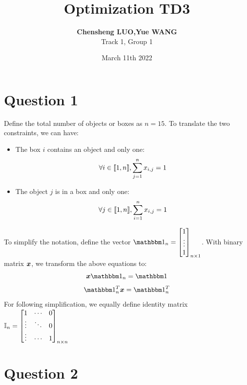 \documentclass{CSArticle}[english]
\title{\textbf{Optimization TD3}}
\author{\textbf{Chensheng LUO,Yue WANG}\\Track 1, Group 1}
\date{March 11th 2022}
\begin{document}
\MakeSimpleTitle


\section{Question 1}
\label{Q1}
Define the total number of objects or boxes as $n=15$. To translate the two constraints, we can have:
\begin{itemize}
    \item The box $i$ contains an object and only one:
\begin{equation}
    \forall i \in \llbracket1,n\rrbracket, \sum_{j=1}^{n}x_{i,j}=1
\end{equation}
\item The object $j$ is in a box and only one:
\begin{equation}
    \forall j \in \llbracket1,n\rrbracket, \sum_{i=1}^{n}x_{i,j}=1
\end{equation}
\end{itemize}
To simplify the notation, define the vector  $\Onebb_{n}=\left[\begin{matrix}
    1\\\vdots\\1
\end{matrix}\right]_{n\times1}$. With binary matrix $\boldsymbol{x}$, we transform the above equations to:
\begin{equation}
    \xbs\Onebb_{n}=\Onebb
\end{equation}
\begin{equation}
    \Onebb_{n}^{T} \xbs=\Onebb_{n}^{T} 
\end{equation}
For following simplification, we equally define identity matrix $\mathbb{I}_{n}=\left[\begin{matrix}
    1&\cdots&0\\\vdots&\ddots&0\\\vdots&\cdots&1
\end{matrix}\right]_{n\times n} $


\section{Question 2}
\end{document}
